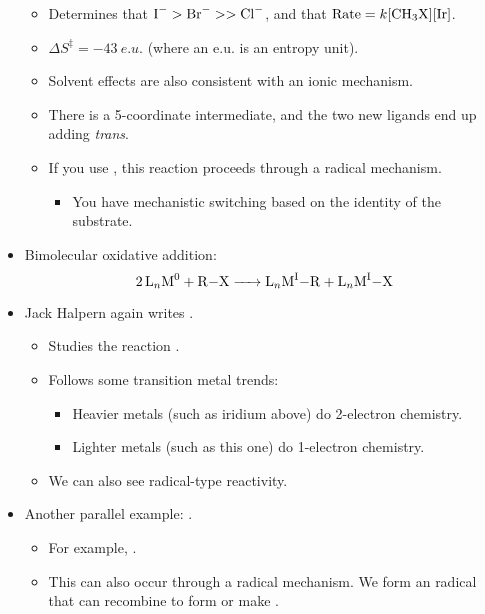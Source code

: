 \documentclass[../notes.tex]{subfiles}
\begin{document}
\begin{itemize}
\begin{itemize}
        \item Determines that $\ce{I-}>\ce{Br-}>>\ce{Cl-}$, and that $\text{Rate}=k\ce{[CH3X][Ir]}$.
        \item $\Delta S^\ddagger=\SI{-43}{{e.u.}}$ (where an e.u. is an entropy unit).
        \item Solvent effects are also consistent with an ionic mechanism.
        \item There is a 5-coordinate intermediate, and the two new ligands end up adding \emph{trans}.
        \item If you use , this reaction proceeds through a radical mechanism.
        \begin{itemize}
            \item You have mechanistic switching based on the identity of the substrate.
        \end{itemize}
    \end{itemize}
    \item Bimolecular oxidative addition:
    \begin{equation*}
        \ce{2L_nM^0 + R-X -> L_nM^I-R + L_nM^I-X}
    \end{equation*}
    \item Jack Halpern again writes \textcite{bib:HalpernBimolecularOxAdn}.
    \begin{itemize}
        \item Studies the reaction .
        \item Follows some transition metal trends:
        \begin{itemize}
            \item Heavier metals (such as iridium above) do 2-electron chemistry.
            \item Lighter metals (such as this one) do 1-electron chemistry.
        \end{itemize}
        \item We can also see radical-type reactivity.
    \end{itemize}
    \item Another parallel example: .
    \begin{itemize}
        \item For example, .
        \item This can also occur through a radical mechanism. We form an  radical that can recombine to form  or make .

\end{itemize}
\end{itemize}
\end{document}
